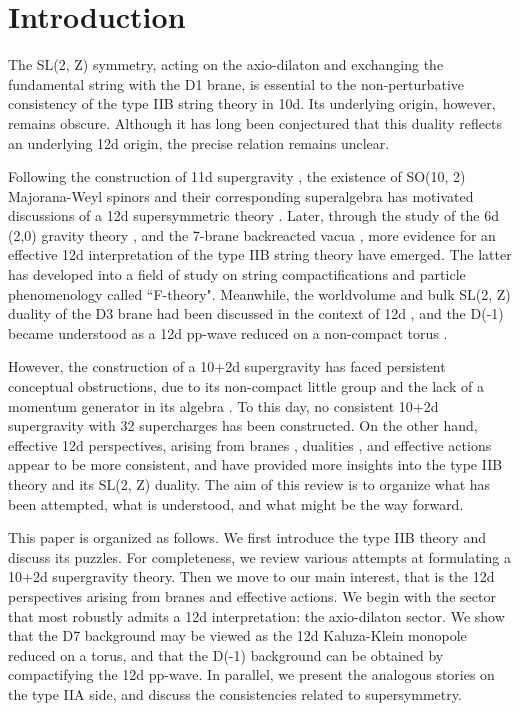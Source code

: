 \section{Introduction}
The SL(2, Z) symmetry, acting on the axio-dilaton and exchanging the fundamental string with the D1 brane, is essential to the non-perturbative consistency of the type IIB string theory in 10d. 
Its underlying origin, however, remains obscure. 
Although it has long been conjectured that this duality reflects an underlying 12d origin, the precise relation remains unclear.


Following the construction of 11d supergravity \cite{Nahm:1977tg,Cremmer1978}, the existence of SO(10, 2) Majorana-Weyl spinors and their corresponding superalgebra has motivated discussions of a 12d supersymmetric theory \cite{Castellani:1982ke,Blencowe:1988sk}.
Later, through the study of the 6d (2,0) gravity theory \cite{Hull:1995xh,Witten:1995em}, and the 7-brane backreacted vacua \cite{Vafa:1996xn}, more evidence for an effective 12d interpretation of the type IIB string theory have emerged.
The latter \cite{Vafa:1996xn} has developed into a field of study on string compactifications and particle phenomenology called ``F-theory".
Meanwhile, the worldvolume and bulk SL(2, Z) duality of the D3 brane had been discussed in the context of 12d \cite{Tseytlin:1996it}, and the D(-1) became understood as a 12d pp-wave reduced on a non-compact torus \cite{Tseytlin:1996ne}.

However, the construction of a 10+2d supergravity \cite{Nishino:1997gq} has faced persistent conceptual obstructions, due to its non-compact little group and the lack of a momentum generator in its algebra \cite{Hewson:1997wv}.
To this day, no consistent 10+2d supergravity with 32 supercharges has been constructed. 
On the other hand, effective 12d perspectives, arising from branes \cite{Tseytlin:1996ne}, dualities \cite{Tseytlin:1996it}, and effective actions \cite{Minasian:2015bxa} appear to be more consistent, and have provided more insights into the type IIB theory and its SL(2, Z) duality.
The aim of this review is to organize what has been attempted, what is understood, and what might be the way forward.


This paper is organized as follows. We first introduce the type IIB theory and discuss its puzzles.
For completeness, we review various attempts at formulating a 10+2d supergravity theory.
Then we move to our main interest, that is the 12d perspectives arising from branes and effective actions.
We begin with the sector that most robustly admits a 12d interpretation: the axio-dilaton sector.
We show that the D7 background may be viewed as the 12d Kaluza-Klein monopole reduced on a torus, and that the D(-1) background can be obtained by compactifying the 12d pp-wave.
In parallel, we present the analogous stories on the type IIA side, and discuss the consistencies related to supersymmetry.

